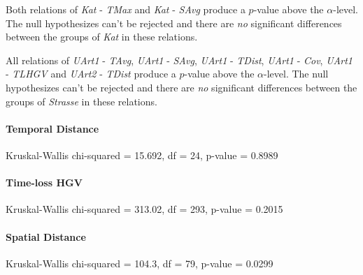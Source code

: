 Both relations of \textit{Kat} - \textit{TMax} and \textit{Kat} - \textit{SAvg} produce a $p$-value above the $\alpha$-level. The null hypothesizes can't be rejected and there are \textit{no} significant differences between the groups of \textit{Kat} in these relations.

All relations of \textit{UArt1} - \textit{TAvg}, \textit{UArt1} - \textit{SAvg}, \textit{UArt1} - \textit{TDist}, \textit{UArt1} - \textit{Cov}, \textit{UArt1} - \textit{TLHGV} and \textit{UArt2} - \textit{TDist} produce a $p$-value above the $\alpha$-level. The null hypothesizes can't be rejected and there are \textit{no} significant differences between the groups of \textit{Strasse} in these relations.


\paragraph{Temporal Distance}
Kruskal-Wallis chi-squared = 15.692, df = 24, p-value = 0.8989

\paragraph{Time-loss HGV}
Kruskal-Wallis chi-squared = 313.02, df = 293, p-value = 0.2015

\paragraph{Spatial Distance}
Kruskal-Wallis chi-squared = 104.3, df = 79, p-value = 0.0299

